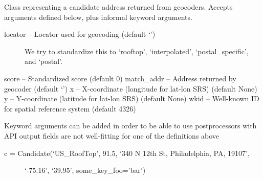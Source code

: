 \documentclass[letterpaper,10pt,english]{sphinxmanual}
\begin{document}
\begin{fulllineitems}
\label{index:omgeo.places.Candidate}
Class representing a candidate address returned from geocoders.
Accepts arguments defined below, plus informal keyword arguments.
\begin{description}
\item[{locator     -- Locator used for geocoding (default `')}] \leavevmode
We try to standardize this to `rooftop', `interpolated',
`postal\_specific', and `postal'.

\end{description}

score       -- Standardized score (default 0)
match\_addr  -- Address returned by geocoder (default `')
x           -- X-coordinate (longitude for lat-lon SRS) (default None)
y           -- Y-coordinate (latitude for lat-lon SRS) (default None)
wkid        -- Well-known ID for spatial reference system (default 4326)

Keyword arguments can be added in order to be able to use postprocessors
with API output fields are not well-fitting for one of the definitions
above
\begin{description}
\item[{c = Candidate(`US\_RoofTop', 91.5, `340 N 12th St, Philadelphia, PA, 19107',}] \leavevmode
`-75.16', `39.95', some\_key\_foo='bar')

\end{description}

\end{fulllineitems}

\end{document}
